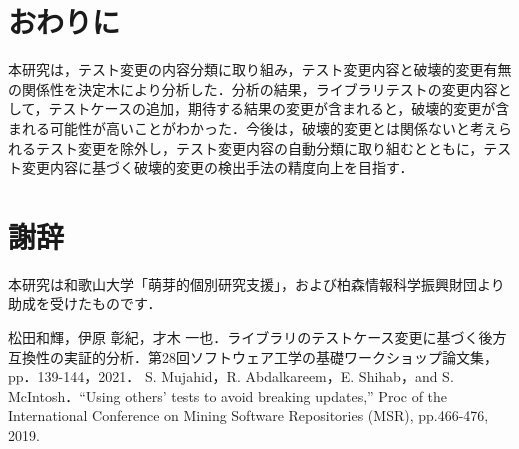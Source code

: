 \documentclass[uplatex,dvipdfmx,a4paper,twocolumn,base=11pt,jbase=11pt,ja=standard]{bxjsarticle}  %
\begin{document}

\section{おわりに}

本研究は，テスト変更の内容分類に取り組み，テスト変更内容と破壊的変更有無の関係性を決定木により分析した．分析の結果，ライブラリテストの変更内容として，テストケースの追加，期待する結果の変更が含まれると，破壊的変更が含まれる可能性が高いことがわかった．今後は，破壊的変更とは関係ないと考えられるテスト変更を除外し，テスト変更内容の自動分類に取り組むとともに，テスト変更内容に基づく破壊的変更の検出手法の精度向上を目指す．

\vspace{-2mm}
\section*{謝辞}

本研究は和歌山大学「萌芽的個別研究支援」，および柏森情報科学振興財団より助成を受けたものです．

\vspace{-2mm}
\begin{thebibliography}{10}
   松田和輝，伊原 彰紀，才木 一也．ライブラリのテストケース変更に基づく後方互換性の実証的分析．第28回ソフトウェア工学の基礎ワークショップ論文集，pp．139-144，2021．
   S. Mujahid，R. Abdalkareem，E. Shihab，and S. McIntosh．``Using others’ tests to avoid breaking updates,'' Proc of the International Conference on Mining Software Repositories (MSR), pp.466-476, 2019.
\end{thebibliography}
\end{document}
